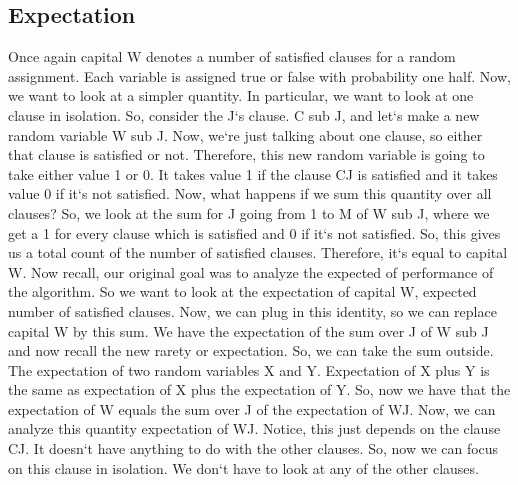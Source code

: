 \subsection{Expectation}
Once again capital W denotes a number of satisfied clauses for a random assignment.
Each variable is assigned true or false with probability one half.
Now, we want to look at a simpler quantity.
In particular, we want to look at one clause in isolation.
So, consider the J`s clause.
C sub J, and let`s make a new random variable W sub J\@.
Now, we`re just talking about one clause, so either that clause is satisfied or not.
Therefore, this new random variable is going to take either value 1 or 0.
It takes value 1 if the clause CJ is satisfied and it takes value 0 if it`s not satisfied.
Now, what happens if we sum this quantity over all clauses? So, we look at the sum for J going from 1 to M of W sub J, where we get a 1 for every clause which is satisfied and 0 if it`s not satisfied.
So, this gives us a total count of the number of satisfied clauses.
Therefore, it`s equal to capital W\@.
Now recall, our original goal was to analyze the expected of performance of the algorithm.
So we want to look at the expectation of capital W, expected number of satisfied clauses.
Now, we can plug in this identity, so we can replace capital W by this sum.
We have the expectation of the sum over J of W sub J and now recall the new rarety or expectation.
So, we can take the sum outside.
The expectation of two random variables X and Y\@.
Expectation of X plus Y is the same as expectation of X plus the expectation of Y\@.
So, now we have that the expectation of W equals the sum over J of the expectation of WJ\@.
Now, we can analyze this quantity expectation of WJ\@.
Notice, this just depends on the clause CJ\@.
It doesn`t have anything to do with the other clauses.
So, now we can focus on this clause in isolation.
We don`t have to look at any of the other clauses.

